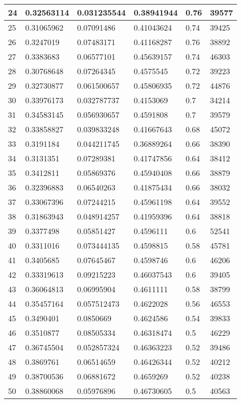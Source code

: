 \begin{longtable}{|l|l|l|l|l|l|}
24 & 0.32563114 & 0.031235544 & 0.38941944 & 0.76 & 39577 \\ \hline 
25 & 0.31065962 & 0.07091486 & 0.41043624 & 0.74 & 39425 \\ \hline 
26 & 0.3247019 & 0.07483171 & 0.41168287 & 0.76 & 38892 \\ \hline 
27 & 0.3383683 & 0.06577101 & 0.45639157 & 0.74 & 46303 \\ \hline 
28 & 0.30768648 & 0.07264345 & 0.4575545 & 0.72 & 39223 \\ \hline 
29 & 0.32730877 & 0.061500657 & 0.45806935 & 0.72 & 44876 \\ \hline 
30 & 0.33976173 & 0.032787737 & 0.4153069 & 0.7 & 34214 \\ \hline 
31 & 0.34583145 & 0.056930657 & 0.4591808 & 0.7 & 39579 \\ \hline 
32 & 0.33858827 & 0.039833248 & 0.41667643 & 0.68 & 45072 \\ \hline 
33 & 0.3191184 & 0.044211745 & 0.36889264 & 0.66 & 38390 \\ \hline 
34 & 0.3131351 & 0.07289381 & 0.41747856 & 0.64 & 38412 \\ \hline 
35 & 0.3412811 & 0.05869376 & 0.45940408 & 0.66 & 38879 \\ \hline 
36 & 0.32396883 & 0.06540263 & 0.41875434 & 0.66 & 38032 \\ \hline 
37 & 0.33067396 & 0.07244215 & 0.45961198 & 0.64 & 39552 \\ \hline 
38 & 0.31863943 & 0.048914257 & 0.41959396 & 0.64 & 38818 \\ \hline 
39 & 0.3377498 & 0.05851427 & 0.4596111 & 0.6 & 52541 \\ \hline 
40 & 0.3311016 & 0.073444135 & 0.4598815 & 0.58 & 45781 \\ \hline 
41 & 0.3405685 & 0.07645467 & 0.4598746 & 0.6 & 46206 \\ \hline 
42 & 0.33319613 & 0.09215223 & 0.46037543 & 0.6 & 39405 \\ \hline 
43 & 0.36064813 & 0.06995904 & 0.4611111 & 0.58 & 38799 \\ \hline 
44 & 0.35457164 & 0.057512473 & 0.4622028 & 0.56 & 46553 \\ \hline 
45 & 0.3490401 & 0.0850669 & 0.4624586 & 0.54 & 39833 \\ \hline 
46 & 0.3510877 & 0.08505334 & 0.46318474 & 0.5 & 46229 \\ \hline 
47 & 0.36745504 & 0.052857324 & 0.46363223 & 0.52 & 39486 \\ \hline 
48 & 0.3869761 & 0.06514659 & 0.46426344 & 0.52 & 40212 \\ \hline 
49 & 0.38700536 & 0.06881672 & 0.4659269 & 0.52 & 40238 \\ \hline 
50 & 0.38860068 & 0.05976896 & 0.46730605 & 0.5 & 40563 \\ \hline 
\end{longtable}